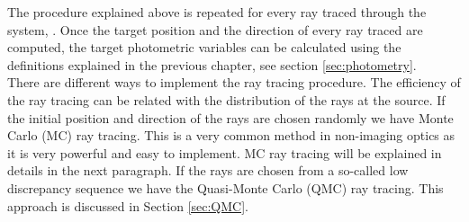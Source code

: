 The procedure explained above is repeated for every ray traced through the system, \cite{Gross2005Handbook}. 
Once the target position and the direction of every ray traced are computed, the target photometric variables can be calculated using the definitions explained in the previous chapter, see section \ref{sec:photometry}.\\ \indent
There are different ways to implement the ray tracing procedure. The efficiency of the ray tracing can be related with the distribution of the rays at the source. 
If the initial position and direction of the rays are chosen randomly we have Monte Carlo (MC) ray tracing. 
This is a very common method in non-imaging optics as it is very powerful and easy to implement. MC ray tracing will be explained in details in the next paragraph.
If the rays are chosen from a so-called low discrepancy sequence we have the Quasi-Monte Carlo (QMC) ray tracing.
This approach is discussed in Section \ref{sec:QMC}.
